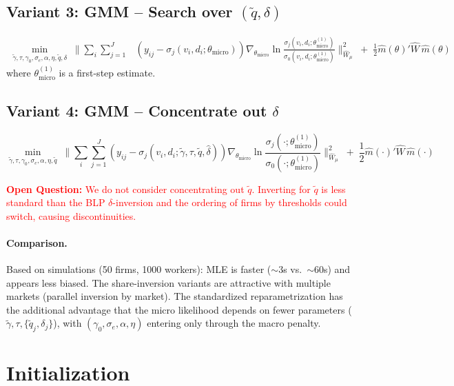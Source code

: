 \documentclass[11pt]{article}
\newcommand{\openq}[1]{\medskip\noindent\textcolor{red}{\textbf{Open Question:} #1}\medskip}
\begin{document}
\subsection{Variant 3: GMM -- Search over $(\tilde q,\delta)$}

\begin{align}\label{eq:var3}
\min_{\tilde\gamma,\tau,\gamma_0,\sigma_e,\alpha,\eta,\tilde q,\delta}\;\Bigg\|\sum_i\sum_{j=1}^J &\left(y_{ij} - \sigma_j(v_i,d_i;\theta_{\text{micro}})\right)\nabla_{\theta_{\text{micro}}}\ln\frac{\sigma_j(v_i,d_i;\theta_{\text{micro}}^{(1)})}{\sigma_0(v_i,d_i;\theta_{\text{micro}}^{(1)})}\Bigg\|^2_{\hat W_\mu} \;+\; \frac{1}{2}\hat m(\theta)'\hat W\,\hat m(\theta)
\end{align}
where $\theta_{\text{micro}}^{(1)}$ is a first-step estimate.

\subsection{Variant 4: GMM -- Concentrate out $\delta$}

\begin{equation}\label{eq:var4}
\min_{\tilde\gamma,\tau,\gamma_0,\sigma_e,\alpha,\eta,\tilde q}\;\Bigg\|\sum_i\sum_{j=1}^J \left(y_{ij} - \sigma_j(v_i,d_i;\tilde\gamma,\tau,\tilde q,\hat\delta)\right)\nabla_{\theta_{\text{micro}}}\ln\frac{\sigma_j(\cdot;\theta_{\text{micro}}^{(1)})}{\sigma_0(\cdot;\theta_{\text{micro}}^{(1)})}\Bigg\|^2_{\hat W_\mu} \;+\; \frac{1}{2}\hat m(\cdot)'\hat W\,\hat m(\cdot)
\end{equation}

\openq{We do not consider concentrating out $\tilde q$. Inverting for $\tilde q$ is less standard than the BLP $\delta$-inversion and the ordering of firms by thresholds could switch, causing discontinuities.}

\paragraph{Comparison.} Based on simulations (50 firms, 1000 workers): MLE is faster ($\sim$3s vs.\ $\sim$60s) and appears less biased. The share-inversion variants are attractive with multiple markets (parallel inversion by market). The standardized reparametrization has the additional advantage that the micro likelihood depends on fewer parameters ($\tilde\gamma, \tau, \{\tilde q_j, \delta_j\}$), with $(\gamma_0,\sigma_e,\alpha,\eta)$ entering only through the macro penalty.

\section{Initialization}\label{sec:init}
\end{document}
